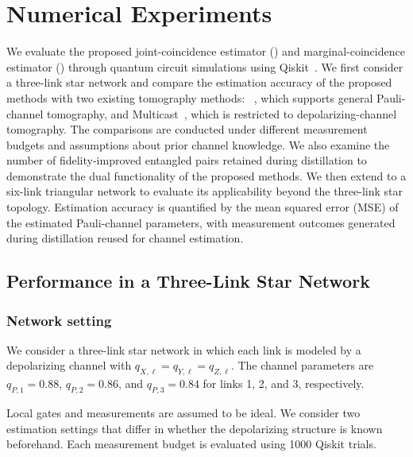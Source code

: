 
\section{Numerical Experiments}
\label{sec:numerical-experiments}

We evaluate the proposed joint-coincidence estimator (\jce) and marginal-coincidence estimator (\mce) through quantum circuit simulations using Qiskit~\cite{javadiabhari2024quantumcomputingqiskit}. We first consider a three-link star network and compare the estimation accuracy of the proposed methods with two existing tomography methods: \mergecast~, which supports general Pauli-channel tomography, and Multicast~\cite{deandrade2024quantumnetworktomography}, which is restricted to depolarizing-channel tomography. The comparisons are conducted under different measurement budgets and assumptions about prior channel knowledge. We also examine the number of fidelity-improved entangled pairs retained during distillation to demonstrate the dual functionality of the proposed methods. We then extend \jce to a six-link triangular network  to evaluate its applicability beyond the three-link star topology. Estimation accuracy is quantified by the mean squared error (MSE) of the estimated Pauli-channel parameters, with measurement outcomes generated during distillation reused for channel estimation.
\subsection{Performance in a Three-Link Star Network}
\label{subsec:star-experiments}

\subsubsection{Network setting}
We consider a three-link star network in which each link is modeled by a depolarizing channel with \(q_{X,\ell}=q_{Y,\ell}=q_{Z,\ell}\). The channel parameters are \(q_{P,1}=0.88\), \(q_{P,2}=0.86\), and \(q_{P,3}=0.84\) for links 1, 2, and 3, respectively. 

Local gates and measurements are assumed to be ideal.
We consider two estimation settings that differ in whether the
depolarizing structure is known beforehand. Each measurement
budget is evaluated using 1000 Qiskit trials.

